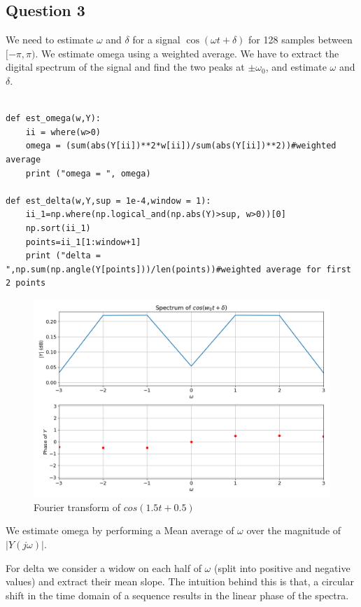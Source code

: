 \documentclass[11pt, a4paper]{article}
\begin{document}
\subsection{Question 3}
We need to estimate $\omega$ and $\delta$ for a signal $\cos(\omega t + \delta)$ for 128 samples between $[-\pi,\pi)$. 
We estimate omega using a weighted average. We have to extract the digital spectrum of the signal and find 
the two peaks at $\pm\omega_0$, and estimate $\omega$ and $\delta$.

\begin{lstlisting}

def est_omega(w,Y):
    ii = where(w>0)
    omega = (sum(abs(Y[ii])**2*w[ii])/sum(abs(Y[ii])**2))#weighted average
    print ("omega = ", omega)

def est_delta(w,Y,sup = 1e-4,window = 1):
    ii_1=np.where(np.logical_and(np.abs(Y)>sup, w>0))[0]
    np.sort(ii_1)
    points=ii_1[1:window+1]
    print ("delta = ",np.sum(np.angle(Y[points]))/len(points))#weighted average for first 2 points

\end{lstlisting}

\begin{figure}[!tbh]
\centering
\includegraphics[scale=0.4]{plots/normal_cosine.png}
\caption{Fourier transform of $cos(1.5t+0.5)$}
\label{fig:10}
\end{figure}

\noindent
We estimate omega by performing a Mean average of $\omega$ over the magnitude of $|Y(j\omega)|$.

\noindent
For delta we consider a widow on each half of $\omega$ (split into positive and negative values) and extract their mean slope. 
The intuition behind this is that, a circular shift in the time domain of a sequence results in the linear phase of the spectra.
\end{document}
